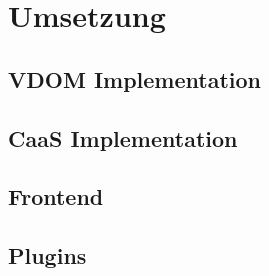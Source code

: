 \chapter{Umsetzung}

\section{\acs{VDOM} Implementation}


\section{\acl{CaaS} Implementation}


\section{Frontend}


\section{Plugins}
